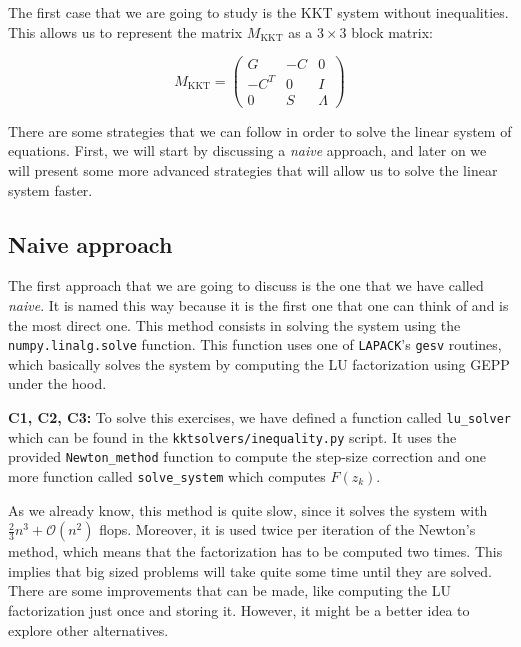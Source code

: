 \documentclass[11pt,a4paper]{article}
\begin{document}
The first case that we are going to study is the KKT system without inequalities.
This allows us to represent the matrix $M_{\text{KKT}}$ as a $3 \times 3$ block
matrix:

\begin{equation}
  \label{eq:3x3-kkt}
  M_{\text{KKT}} =
  \begin{pmatrix}
    G & -C & 0 \\
    -C^T & 0 & I \\
    0 & S & \Lambda
  \end{pmatrix}
\end{equation}
  


There are some strategies that we can follow in order to solve the linear system of
equations. First, we will start by discussing a \textit{naive} approach, and later on we will present
some more advanced strategies that will allow us to solve the linear system faster.

\subsection{Naive approach}

The first approach that we are going to discuss is the one that we have called \textit{naive}. It
is named this way because it is the first one that one can think of and is the most direct one.
This method consists in solving the system using the \texttt{numpy.linalg.solve} function.
This function uses one of \texttt{LAPACK}'s \texttt{gesv} routines, which basically solves the system
by computing the LU factorization using GEPP under the hood.

\noindent \textbf{C1, C2, C3:} To solve this exercises, we have defined a function called
\texttt{lu\_solver} which can be found in the \texttt{kktsolvers/inequality.py} script.
It uses the provided \texttt{Newton\_method} function to compute the step-size correction
and one more function called \texttt{solve\_system} which computes $F(z_k)$.

As we already know, this method is quite slow, since it solves the system with $\frac{2}{3}n^3 + \mathcal{O}(n^2)$
flops. Moreover, it is used twice per iteration of the Newton's method, which means that
the factorization has to be computed two times. This implies that big sized problems will take
quite some time until they are solved. There are some improvements that can be made, like computing
the LU factorization just once and storing it. However, it might be a better idea to explore
other alternatives.
\end{document}
